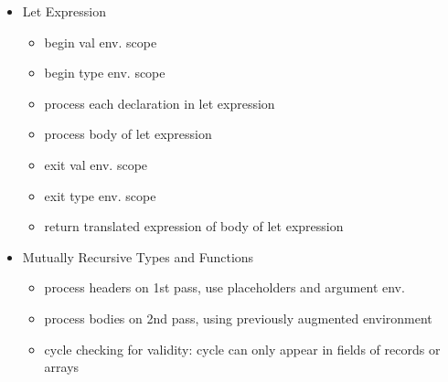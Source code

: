 \documentclass[8pt]{extarticle}
\begin{document}
\begin{multicols*}{2}
\begin{itemize}
  \item Let Expression
    \begin{itemize}
    \item begin val env. scope
    \item begin type env. scope
    \item process each declaration in let expression
    \item process body of let expression
    \item exit val env. scope
    \item exit type env. scope
    \item return translated expression of body of let expression
    \end{itemize}
  \item Mutually Recursive Types and Functions
    \begin{itemize}
    \item process headers on 1st pass, use placeholders and argument env.
    \item process bodies on 2nd pass, using previously augmented environment
    \item cycle checking for validity: cycle can only appear in fields of records or arrays
    \end{itemize}
  \end{itemize}
  
  \vfill\null
  \columnbreak


\end{multicols*}
\end{document}
